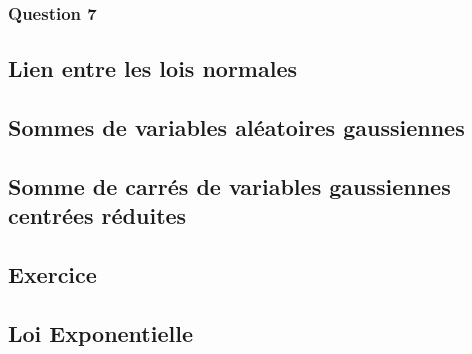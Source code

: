         \subsubsection{Question 7}

    \subsection{Lien entre les lois normales}

    \subsection{Sommes de variables aléatoires gaussiennes}

    \subsection{Somme de carrés de variables gaussiennes centrées réduites}

    \subsection{Exercice}

    \subsection{Loi Exponentielle}



